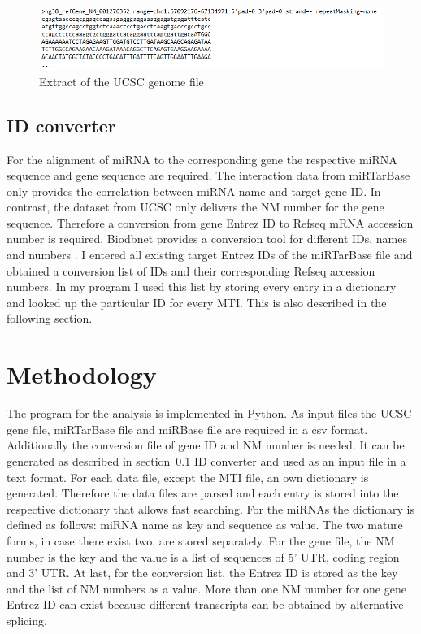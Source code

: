 \documentclass[11pt, a4paper, oneside]{book}
\begin{document}
\begin{figure}[h]
\centering
\includegraphics[width=\textwidth]{results/ucsc.png}
\caption{Extract of the UCSC genome file}
\label{ucsc_scrot}
\end{figure}



\subsection{ID converter}
\label{sec:id}
For the alignment of miRNA to the corresponding gene the respective miRNA sequence and gene sequence are required. The interaction data from miRTarBase only provides the correlation between miRNA name and target gene ID. In contrast, the dataset from UCSC only delivers the NM number for the gene sequence. Therefore a conversion from gene Entrez ID to Refseq mRNA accession number is required. Biodbnet provides a conversion tool for different IDs, names and numbers \cite{biodb}. I entered all existing target Entrez IDs of the miRTarBase file and obtained a conversion list of IDs and their corresponding Refseq accession numbers. In my program I used this list by storing every entry in a dictionary and looked up the particular ID for every MTI. This is also described in the following section.
 


\vspace{1cm}


\section{Methodology}
\label{sec:meth}


The program for the analysis is implemented in Python. As input files the UCSC gene file, miRTarBase file and miRBase file are required in a csv format. Additionally the conversion file of gene ID and NM number is needed. It can be generated as described in section~\ref{sec:id} ID converter and used as an input file in a text format. 
For each data file, except the MTI file, an own dictionary is generated. Therefore the data files are parsed and each entry is stored into the respective dictionary that allows fast searching. For the miRNAs the dictionary is defined as follows: miRNA name as key and sequence as value. The two mature forms, in case there exist two, are stored separately. For the gene file, the NM number is the key and the value is a list of sequences of 5' UTR, coding region and 3' UTR. At last, for the conversion list, the Entrez ID is stored as the key and the list of NM numbers as a value. More than one NM number for one gene Entrez ID can exist because different transcripts can be obtained by alternative splicing. \\
\end{document}
